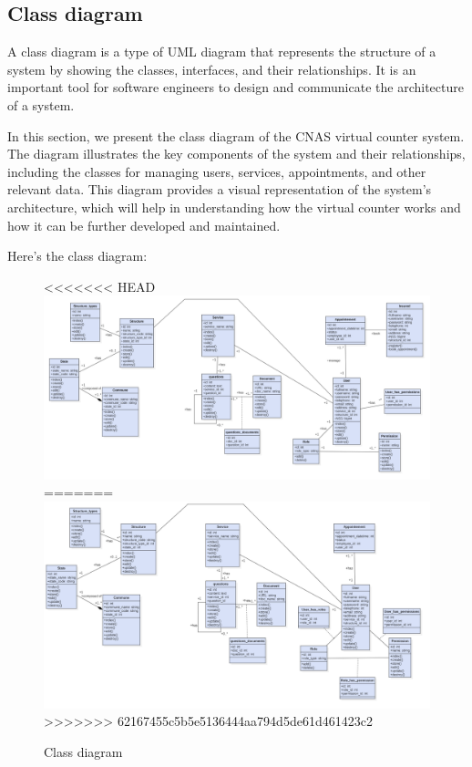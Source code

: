 \subsection{Class diagram}
A class diagram is a type of UML diagram that represents the structure of a system by showing the classes, interfaces, and their relationships. It is an important tool for software engineers to design and communicate the architecture of a system. 

\medskip In this section, we present the class diagram of the CNAS virtual counter system. The diagram illustrates the key components of the system and their relationships, including the classes for managing users, services, appointments, and other relevant data. This diagram provides a visual representation of the system's architecture, which will help in understanding how the virtual counter works and how it can be further developed and maintained.

\bigskip Here's the class diagram:
\begin{figure}[H]
    \centering
<<<<<<< HEAD
    \includegraphics[width=1.0\textwidth]{class_diagram.PNG}
=======
    \includegraphics[width=1.1\textwidth]{ClassDiagram.png}
>>>>>>> 62167455c5b5e5136444aa794d5de61d461423c2
    \caption{Class diagram}
    \label{classdiagram}
\end{figure}
\newpage

